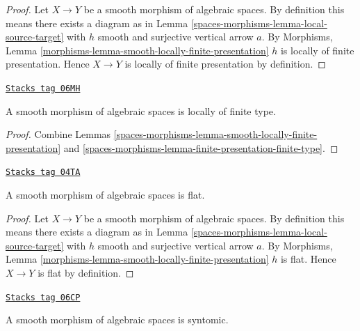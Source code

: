\begin{proof}
Let $X \to Y$ be a smooth morphism of algebraic spaces. By
definition this means there exists a diagram as in
Lemma \ref{spaces-morphisms-lemma-local-source-target}
with $h$ smooth and surjective vertical arrow $a$. By
Morphisms, Lemma \ref{morphisms-lemma-smooth-locally-finite-presentation}
$h$ is locally of finite presentation. Hence $X \to Y$ is
locally of finite presentation by definition.
\end{proof}

\begin{lemma}
\label{spaces-morphisms-lemma-smooth-locally-finite-type}
\href{https://stacks.math.columbia.edu/tag/06MH}{\texttt{Stacks tag 06MH}}

A smooth morphism of algebraic spaces is locally of finite type.
\end{lemma}

\begin{proof}
Combine
Lemmas \ref{spaces-morphisms-lemma-smooth-locally-finite-presentation} and
\ref{spaces-morphisms-lemma-finite-presentation-finite-type}.
\end{proof}

\begin{lemma}
\label{spaces-morphisms-lemma-smooth-flat}
\href{https://stacks.math.columbia.edu/tag/04TA}{\texttt{Stacks tag 04TA}}

A smooth morphism of algebraic spaces is flat.
\end{lemma}

\begin{proof}
Let $X \to Y$ be a smooth morphism of algebraic spaces. By
definition this means there exists a diagram as in
Lemma \ref{spaces-morphisms-lemma-local-source-target}
with $h$ smooth and surjective vertical arrow $a$. By
Morphisms, Lemma \ref{morphisms-lemma-smooth-locally-finite-presentation}
$h$ is flat. Hence $X \to Y$ is flat by definition.
\end{proof}

\begin{lemma}
\label{spaces-morphisms-lemma-smooth-syntomic}
\href{https://stacks.math.columbia.edu/tag/06CP}{\texttt{Stacks tag 06CP}}

A smooth morphism of algebraic spaces is syntomic.
\end{lemma}

